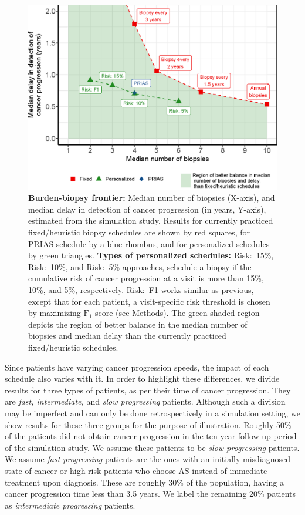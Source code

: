 \begin{figure}[!htb]
\captionsetup{justification=justified}
\centerline{\includegraphics[width=\columnwidth]{images/better_balance_results.eps}}
\caption{\textbf{Burden-biopsy frontier:} Median number of biopsies (X-axis), and median delay in detection of cancer progression (in years, Y-axis), estimated from the simulation study. Results for currently practiced fixed/heuristic biopsy schedules are shown by red squares, for PRIAS schedule by a blue rhombus, and for personalized schedules by green triangles. \textbf{Types of personalized schedules:} Risk:~15\%, Risk:~10\%, and Risk:~5\% approaches, schedule a biopsy if the cumulative risk of cancer progression at a visit is more than 15\%, 10\%, and 5\%, respectively. Risk:~F1 works similar as previous, except that for each patient, a visit-specific risk threshold is chosen by maximizing $\mbox{F}_1$ score (see \hyperref[sec:methods]{Methods}). The green shaded region depicts the region of better balance in the median number of biopsies and median delay than the currently practiced fixed/heuristic schedules.}
\label{fig:better_balance_results}
\end{figure}

Since patients have varying cancer progression speeds, the impact of each schedule also varies with it. In order to highlight these differences, we divide results for three types of patients, as per their time of cancer progression. They are \textit{fast, intermediate,} and \textit{slow progressing} patients. Although such a division may be imperfect and can only be done retrospectively in a simulation setting, we show results for these three groups for the purpose of illustration. Roughly 50\% of the patients did not obtain cancer progression in the ten year follow-up period of the simulation study. We assume these patients to be \textit{slow progressing} patients. We assume \textit{fast progressing} patients are the ones with an initially misdiagnosed state of cancer \cite{cooperberg2011outcomes} or high-risk patients who choose AS instead of immediate treatment upon diagnosis. These are roughly 30\% of the population, having a cancer progression time less than 3.5 years. We label the remaining 20\% patients as \textit{intermediate progressing} patients. 

